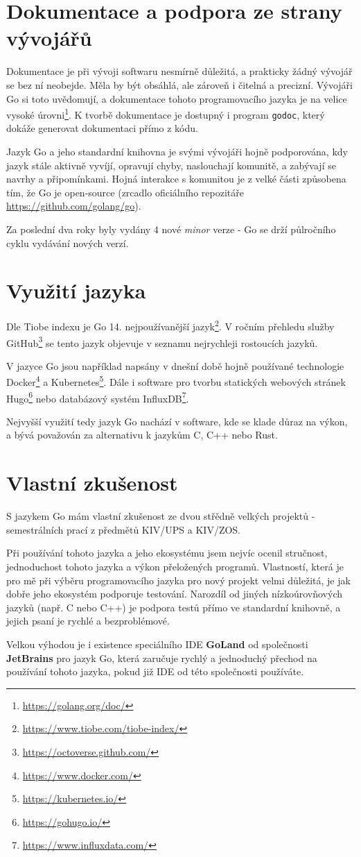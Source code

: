 \documentclass[12pt, a4paper]{article}
\let\oldsection\section
\renewcommand\section{\clearpage\oldsection}
\begin{document}
\section{Dokumentace a podpora ze strany vývojářů}

Dokumentace je při vývoji softwaru nesmírně důležitá, a prakticky žádný vývojář se bez ní neobejde. Měla by být obsáhlá, ale zároveň i čitelná a precizní. Vývojáři Go si toto uvědomují, a dokumentace tohoto programovacího jazyka je na velice vysoké úrovni\footnote{\url{https://golang.org/doc/}}. K tvorbě dokumentace je dostupný i program \texttt{godoc}, který dokáže generovat dokumentaci přímo z kódu.

Jazyk Go a jeho standardní knihovna je svými vývojáři hojně podporována, kdy jazyk stále aktivně vyvíjí, opravují chyby, naslouchají komunitě, a zabývají se navrhy a připomínkami. Hojná interakce s komunitou je z velké části způsobena tím, že Go je open-source (zrcadlo oficiálního repozitáře \url{https://github.com/golang/go}). 

Za poslední dva roky byly vydány 4 nové \textit{minor} verze - Go se drží půlročního cyklu vydávání nových verzí.

\section{Využití jazyka}

Dle Tiobe indexu je Go 14. nejpoužívanější jazyk\footnote{\url{https://www.tiobe.com/tiobe-index/}}. V ročním přehledu služby GitHub\footnote{\url{https://octoverse.github.com/}} se tento jazyk objevuje v seznamu nejrychleji rostoucích jazyků.

V jazyce Go jsou například napsány v dnešní době hojně používané technologie Docker\footnote{\url{https://www.docker.com/}} a Kubernetes\footnote{\url{https://kubernetes.io/}}. Dále i software pro tvorbu statických webových stránek Hugo\footnote{\url{https://gohugo.io/}} nebo databázový systém InfluxDB\footnote{\url{https://www.influxdata.com/}}.

Nejvyšší využití tedy jazyk Go nachází v software, kde se klade důraz na výkon, a bývá považován za alternativu k jazykům C, C++ nebo Rust.


\section{Vlastní zkušenost}

S jazykem Go mám vlastní zkušenost ze dvou střědně velkých projektů - semestrálních prací z předmětů KIV/UPS a KIV/ZOS.

Při používání tohoto jazyka a jeho ekosystému jsem nejvíc ocenil stručnost, jednoduchost tohoto jazyka a výkon přeložených programů. Vlastností, která je pro mě při výběru programovacího jazyka pro nový projekt velmi důležitá, je jak dobře jeho ekosystém podporuje testování. Narozdíl od jiných nízkoúrovňových jazyků (např. C nebo C++) je podpora testů přímo ve standardní knihovně, a jejich psaní je rychlé a bezproblémové.

Velkou výhodou je i existence speciálního IDE \textbf{GoLand} od společnosti \textbf{JetBrains} pro jazyk Go, která zaručuje rychlý a jednoduchý přechod na používání tohoto
jazyka, pokud již IDE od této společnosti používáte.
\end{document}
